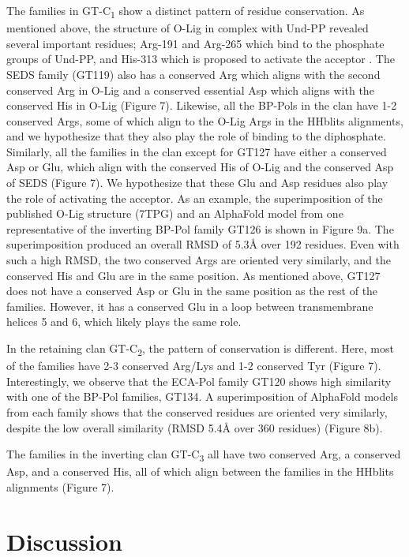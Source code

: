 \documentclass{article}
\begin{document}
The families in GT-C\textsubscript{1} show a distinct pattern of residue conservation. As mentioned above, the structure of O-Lig in complex with Und-PP revealed several important residues; Arg-191 and Arg-265 which bind to the phosphate groups of Und-PP, and His-313 which is proposed to activate the acceptor \cite{ashraf_structural_2022}. The SEDS family (GT119) also has a conserved Arg which aligns with the second conserved Arg in O-Lig and a conserved essential Asp which aligns with the conserved His in O-Lig (Figure 7). Likewise, all the BP-Pols in the clan have 1-2 conserved Args, some of which align to the O-Lig Args in the HHblits alignments, and we hypothesize that they also play the role of binding to the diphosphate. Similarly, all the families in the clan except for GT127 have either a conserved Asp or Glu, which align with the conserved His of O-Lig and the conserved Asp of SEDS (Figure 7). We hypothesize that these Glu and Asp residues also play the role of activating the acceptor. As an example, the superimposition of the published O-Lig structure (7TPG) \cite{ashraf_structural_2022} and an AlphaFold model from one representative of the inverting BP-Pol family GT126 is shown in Figure 9a. The superimposition produced an overall RMSD of 5.3Å over 192 residues. Even with such a high RMSD, the two conserved Args are oriented very similarly, and the conserved His and Glu are in the same position. As mentioned above, GT127 does not have a conserved Asp or Glu in the same position as the rest of the families. However, it has a conserved Glu in a loop between transmembrane helices 5 and 6, which likely plays the same role.

In the retaining clan GT-C\textsubscript{2}, the pattern of conservation is different. Here, most of the families have 2-3 conserved Arg/Lys and 1-2 conserved Tyr (Figure 7). Interestingly, we observe that the ECA-Pol family GT120 shows high similarity with one of the BP-Pol families, GT134. A superimposition of AlphaFold models from each family shows that the conserved residues are oriented very similarly, despite the low overall similarity (RMSD 5.4Å over 360 residues) (Figure 8b).

The families in the inverting clan GT-C\textsubscript{3} all have two conserved Arg, a conserved Asp, and a conserved His, all of which align between the families in the HHblits alignments (Figure 7).

\section{Discussion}
\end{document}

